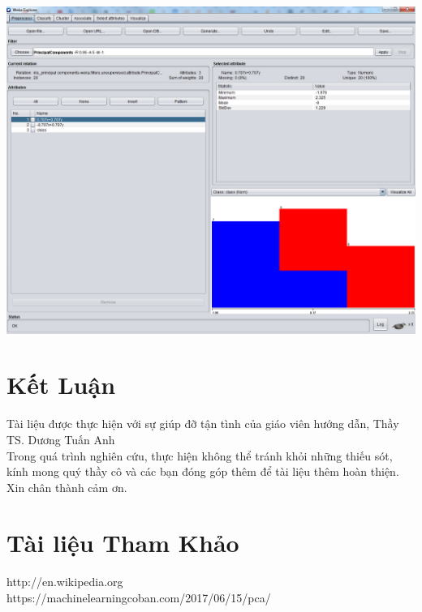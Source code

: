 \documentclass{hcmutarticle}
\begin{document}
\begin{center}
	\includegraphics[scale=0.5]{image/result_1.png}
\end{center}

\section{Kết Luận }\label{result}
Tài liệu được thực hiện  với sự giúp đỡ tận tình của giáo viên hướng dẫn, Thầy TS. Dương Tuấn Anh\\
Trong quá trình nghiên cứu, thực hiện không thể tránh khỏi những  thiếu sót, kính mong quý thầy  cô và các bạn đóng góp thêm để tài liệu thêm hoàn thiện.\\
Xin chân thành cảm ơn.


\section{Tài liệu Tham Khảo }




http://en.wikipedia.org\\
https://machinelearningcoban.com/2017/06/15/pca/ \\

\end{document}
